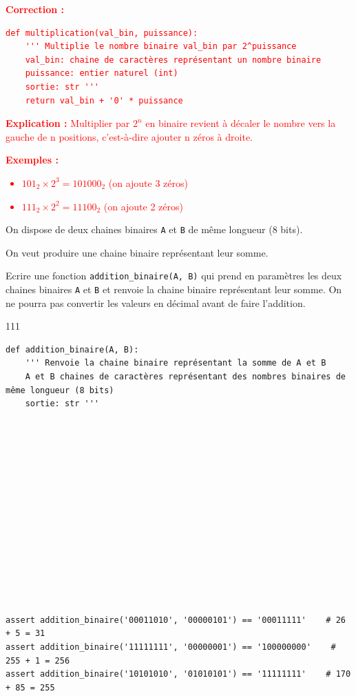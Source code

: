 \documentclass[a4paper,10pt]{report}
\begin{document}
\textcolor{red}{
\textbf{Correction :}
\begin{verbatim}
def multiplication(val_bin, puissance):
    ''' Multiplie le nombre binaire val_bin par 2^puissance
    val_bin: chaine de caractères représentant un nombre binaire
    puissance: entier naturel (int)
    sortie: str '''
    return val_bin + '0' * puissance
\end{verbatim}
\textbf{Explication :} Multiplier par $2^n$ en binaire revient à décaler le nombre vers la gauche de n positions, c'est-à-dire ajouter n zéros à droite.

\textbf{Exemples :}
\begin{itemize}
    \item $101_2 \times 2^3 = 101000_2$ (on ajoute 3 zéros)
    \item $111_2 \times 2^2 = 11100_2$ (on ajoute 2 zéros)
\end{itemize}
}

    \pagebreak
    \thispagestyle{DS_LP}


    On dispose de deux chaines binaires \verb|A| et \verb|B| de même longueur (8 bits).

    On veut produire une chaine binaire représentant leur somme.

    Ecrire une fonction \verb|addition_binaire(A, B)| qui prend en paramètres les deux chaines binaires \verb|A| et \verb|B| et renvoie la chaine binaire représentant leur somme. On ne pourra pas convertir les valeurs en décimal avant de faire l'addition.

\begin{answer}{1}{11} 
\begin{verbatim}
def addition_binaire(A, B):
    ''' Renvoie la chaine binaire représentant la somme de A et B
    A et B chaines de caractères représentant des nombres binaires de même longueur (8 bits)
    sortie: str '''















assert addition_binaire('00011010', '00000101') == '00011111'    # 26 + 5 = 31
assert addition_binaire('11111111', '00000001') == '100000000'    # 255 + 1 = 256
assert addition_binaire('10101010', '01010101') == '11111111'    # 170 + 85 = 255
    \end{verbatim}

    \end{answer}
\end{document}
